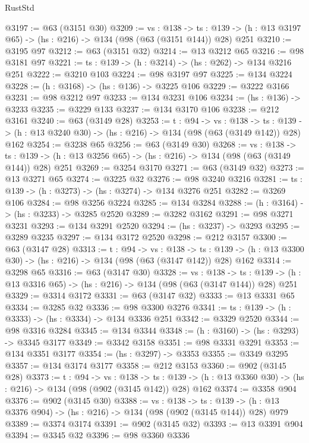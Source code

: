 \begin{lexlean}{RustStd}
\begin{coremodule}
@3197 := @63 (@3151 @30)
@3209 := {vs : @138} ->
  {ts : @139} -> (h : @13 @3197 @65) -> (hs : @216) -> @134 (@98 (@63 (@3151 @144)) @28) @251
@3210 := @3195 @97
@3212 := @63 (@3151 @32)
@3214 := @13 @3212 @65
@3216 := @98 @3181 @97
@3221 := {ts : @139} -> (h : @3214) -> (hs : @262) -> @134 @3216 @251
@3222 := @3210 @103
@3224 := @98 @3197 @97
@3225 := @134 @3224
@3228 := (h : @3168) -> (hs : @136) -> @3225 @106
@3229 := @3222 @3166
@3231 := @98 @3212 @97
@3233 := @134 @3231 @106
@3234 := (hs : @136) -> @3233
@3235 := @3229 @133
@3237 := @134 @3170 @106
@3238 := @212 @3161
@3240 := @63 (@3149 @28)
@3253 := {t : @94} ->
  {vs : @138} ->
  {ts : @139} -> (h : @13 @3240 @30) -> (hs : @216) -> @134 (@98 (@63 (@3149 @142)) @28) @162
@3254 := @3238 @65
@3256 := @63 (@3149 @30)
@3268 := {vs : @138} ->
  {ts : @139} -> (h : @13 @3256 @65) -> (hs : @216) -> @134 (@98 (@63 (@3149 @144)) @28) @251
@3269 := @3254 @3170
@3271 := @63 (@3149 @32)
@3273 := @13 @3271 @65
@3274 := @3225 @32
@3276 := @98 @3240 @3216
@3281 := {ts : @139} -> (h : @3273) -> (hs : @3274) -> @134 @3276 @251
@3282 := @3269 @106
@3284 := @98 @3256 @3224
@3285 := @134 @3284
@3288 := (h : @3164) -> (hs : @3233) -> @3285 @2520
@3289 := @3282 @3162
@3291 := @98 @3271 @3231
@3293 := @134 @3291 @2520
@3294 := (hs : @3237) -> @3293
@3295 := @3289 @3235
@3297 := @134 @3172 @2520
@3298 := @212 @3157
@3300 := @63 (@3147 @28)
@3313 := {t : @94} ->
  {vs : @138} ->
  {ts : @139} -> (h : @13 @3300 @30) -> (hs : @216) -> @134 (@98 (@63 (@3147 @142)) @28) @162
@3314 := @3298 @65
@3316 := @63 (@3147 @30)
@3328 := {vs : @138} ->
  {ts : @139} -> (h : @13 @3316 @65) -> (hs : @216) -> @134 (@98 (@63 (@3147 @144)) @28) @251
@3329 := @3314 @3172
@3331 := @63 (@3147 @32)
@3333 := @13 @3331 @65
@3334 := @3285 @32
@3336 := @98 @3300 @3276
@3341 := {ts : @139} -> (h : @3333) -> (hs : @3334) -> @134 @3336 @251
@3342 := @3329 @2520
@3344 := @98 @3316 @3284
@3345 := @134 @3344
@3348 := (h : @3160) -> (hs : @3293) -> @3345 @3177
@3349 := @3342 @3158
@3351 := @98 @3331 @3291
@3353 := @134 @3351 @3177
@3354 := (hs : @3297) -> @3353
@3355 := @3349 @3295
@3357 := @134 @3174 @3177
@3358 := @212 @3153
@3360 := @902 (@3145 @28)
@3373 := {t : @94} ->
  {vs : @138} ->
  {ts : @139} -> (h : @13 @3360 @30) -> (hs : @216) -> @134 (@98 (@902 (@3145 @142)) @28) @162
@3374 := @3358 @904
@3376 := @902 (@3145 @30)
@3388 := {vs : @138} ->
  {ts : @139} -> (h : @13 @3376 @904) -> (hs : @216) -> @134 (@98 (@902 (@3145 @144)) @28) @979
@3389 := @3374 @3174
@3391 := @902 (@3145 @32)
@3393 := @13 @3391 @904
@3394 := @3345 @32
@3396 := @98 @3360 @3336

\end{coremodule}
\end{lexlean}
